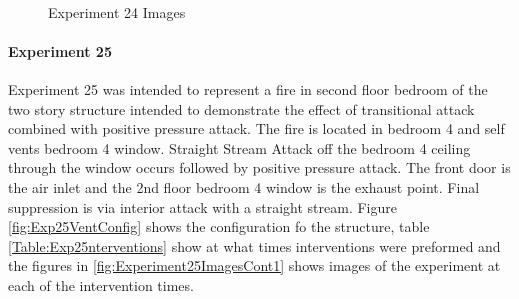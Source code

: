 \documentclass{article}
\begin{document}
\begin{figure}[H]
	\ContinuedFloat 
	\centering 
	 \ 
	\caption{Experiment 24 Images}
	\label{fig:Experiment24ImagesCont3} 
\end{figure}

\paragraph{Experiment 25}\mbox{}

Experiment 25 was intended to represent a fire in second floor bedroom of the two story structure intended to demonstrate the effect of transitional attack combined with positive pressure attack. The fire is located in bedroom 4 and self vents bedroom 4 window. Straight Stream Attack off the bedroom 4 ceiling through the window occurs followed by positive pressure attack. The front door is the air inlet and the 2nd floor bedroom 4 window is the exhaust point. Final suppression is via interior attack with a straight stream. Figure \ref{fig:Exp25VentConfig} shows the configuration fo the structure, table \ref{Table:Exp25nterventions} show at what times interventions were preformed and the figures in \ref{fig:Experiment25ImagesCont1} shows images of the experiment at each of the intervention times.
\end{document}
